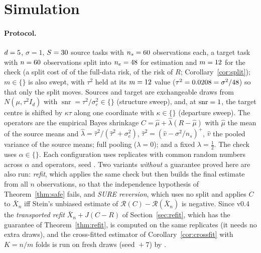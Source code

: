 \documentclass[10pt,a4paper]{article}
\theoremstyle{plain}
\theoremstyle{definition}
\theoremstyle{remark}
\newcommand{\risk}{\mathcal{R}}
\DeclareMathOperator{\snr}{snr}
\begin{document}
\section{Simulation}\label{sec:sim}

\paragraph{Protocol.}
$d=5$, $\sigma=1$, $S=30$ source tasks with $n_s=60$ observations each, a target task with $n=60$ observations split into $n_e=48$ for estimation and $m=12$ for the check (a split cost of \SplitCost{} of the full-data risk, \SplitCostR{} of the risk of $R$; Corollary~\ref{cor:split}); $m\in\{$\CmGrid$\}$ is also swept, with $\tau^2$ held at its $m=12$ value ($\tau^2=0.0208=\sigma^2/48$) so that only the split moves. Sources and target are exchangeable draws from $N(\mu,\tau^2 I_d)$ with $\snr=\tau^2/\sigma_e^2\in\{$\CsnrGrid$\}$ (structure sweep), and, at $\snr=\CsnrDep$, the target centre is shifted by $\kappa\tau$ along one coordinate with $\kappa\in\{$\CdepGrid$\}$ (departure sweep). The operators are the empirical Bayes shrinkage $C=\hat\mu+\hat\lambda(R-\hat\mu)$ with $\hat\mu$ the mean of the source means and $\hat\lambda=\hat\tau^2/(\hat\tau^2+\sigma_e^2)$, $\hat\tau^2=(\hat v-\sigma^2/n_s)^+$, $\hat v$ the pooled variance of the source means; full pooling ($\lambda=0$); and a fixed $\lambda=\tfrac12$. The check uses $\alpha\in\{$\CalphaGrid$\}$. Each configuration uses \MetaR{} replicates with common random numbers across $\alpha$ and operators, seed \MetaSeed. Two variants \emph{without} a guarantee proved here are also run: \emph{refit}, which applies the same check but then builds the final estimate from all $n$ observations, so that the independence hypothesis of Theorem~\ref{thm:safe} fails, and \emph{SURE reversion}, which uses no split and applies $C$ to $\bar X_n$ iff Stein's unbiased estimate \citep{stein1981} of $\risk(C)-\risk(\bar X_n)$ is negative. Since v0.4 the \emph{transported refit} $\bar X_n+J(C-R)$ of Section~\ref{sec:refit}, which has the guarantee of Theorem~\ref{thm:refit}, is computed on the same replicates (it needs no extra draws), and the cross-fitted estimator of Corollary~\ref{cor:crossfit} with $K=n/m$ folds is run on fresh draws (seed \MetaSeed${}+7$) by .
\end{document}
